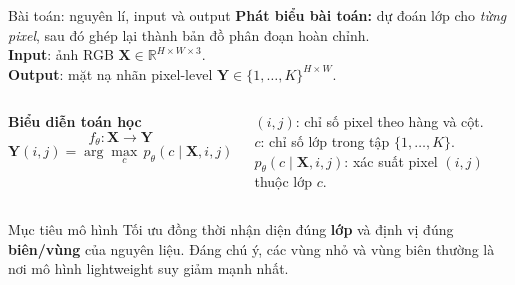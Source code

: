 \begin{frame}{Bài toán: nguyên lí, input và output}
      \textbf{Phát biểu bài toán:} dự đoán lớp cho \emph{từng pixel}, sau đó ghép lại thành bản đồ phân đoạn hoàn chỉnh.\\
      \vspace{0.25em}
\textbf{Input}: ảnh RGB $\mathbf{X}\in\mathbb{R}^{H\times W\times 3}$.\\
\textbf{Output}: mặt nạ nhãn pixel-level $\mathbf{Y}\in\{1,\dots,K\}^{H\times W}$.
      \vspace{0.25em}
      \begin{columns}[T,onlytextwidth]
        \textbf{Biểu diễn toán học}
        \[
          f_\theta:\mathbf{X}\to\mathbf{Y}
        \]
        \[
          \mathbf{Y}(i,j)=\arg\max_c\,p_\theta(c\mid\mathbf{X},i,j)
        \]

        \vspace{2em}
             $(i,j)$: chỉ số pixel theo hàng và cột.\\
             $c$: chỉ số lớp trong tập $\{1,\dots,K\}$.\\
            $p_\theta(c\mid\mathbf{X},i,j)$: xác suất pixel $(i,j)$ thuộc lớp $c$.
\      \end{columns}

      \vspace{0.35em}
      \begin{block}{Mục tiêu mô hình}
        Tối ưu đồng thời nhận diện đúng \textbf{lớp} và định vị đúng \textbf{biên/vùng} của nguyên liệu. Đáng chú ý, các vùng nhỏ và vùng biên thường là nơi mô hình lightweight suy giảm mạnh nhất.
      \end{block}
\end{frame}

